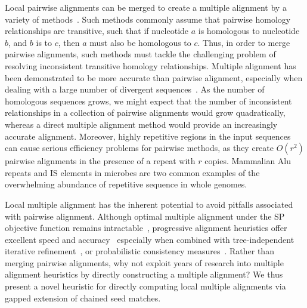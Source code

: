 \documentclass[10pt,journal,letterpaper,compsoc,peerreview]{IEEEtran}
\begin{document}
Local pairwise alignments can be merged to create a multiple alignment
by a variety of
methods~\cite{ref-tba,ref-dialign,ref-related1}. Such methods
commonly assume that pairwise homology relationships are transitive,
such that if nucleotide $a$ is homologous to nucleotide $b$, and $b$
is to $c$, then $a$ must also be homologous to $c$.  Thus, in order to
merge pairwise alignments, such methods must tackle the challenging
problem of resolving inconsistent transitive homology relationships.
Multiple alignment has been demonstrated to be more accurate than
pairwise alignment, especially when dealing with a large number of
divergent sequences~\cite{ref-mlagan,ref-aubergene}.  As the number of
homologous sequences grows, we might expect that the number of
inconsistent relationships in a collection of pairwise alignments
would grow quadratically, whereas a direct multiple alignment method
would provide an increasingly accurate alignment.  Moreover, highly
repetitive regions in the input sequences can cause serious efficiency
problems for pairwise methods, as they create $O(r^{2})$ pairwise
alignments in the presence of a repeat with $r$ copies.  Mammalian Alu
repeats and IS elements in microbes are two common examples of the
overwhelming abundance of repetitive sequence in whole genomes.

Local multiple alignment has the inherent potential to avoid pitfalls
associated with pairwise alignment. Although optimal multiple
alignment under the SP objective function remains
intractable~\cite{ref-wangjiang}, progressive alignment heuristics
offer excellent speed and accuracy~\cite{ref-clustalw,ref-tcoffee}
especially when combined with tree-independent iterative
refinement~\cite{ref-muscle}, or probabilistic consistency
measures~\cite{ref-probcons}. Rather than merging pairwise alignments,
why not exploit years of research into multiple alignment heuristics
by directly constructing a multiple alignment? We thus present a novel
heuristic for directly computing local multiple alignments via gapped
extension of chained seed matches.
\end{document}
